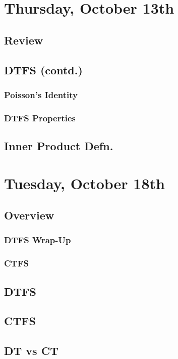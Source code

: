 \section{Thursday, October 13th}
\subsection{Review}
\subsection{DTFS (contd.)}
\subsubsection{Poisson's Identity}
\subsubsection{DTFS Properties}
\subsection{Inner Product Defn.}


\section{Tuesday, October 18th}
\subsection{Overview}
\subsubsection{DTFS Wrap-Up}
\subsubsection{CTFS}
\subsection{DTFS}
\subsection{CTFS}
\subsection{DT vs CT}


